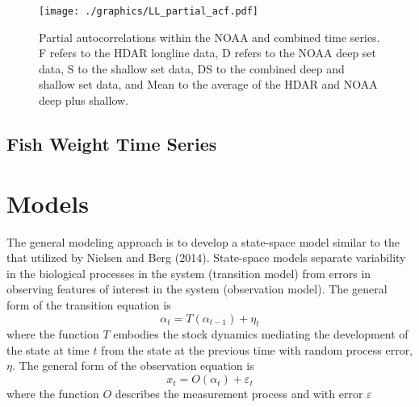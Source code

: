 \documentclass[12pt,letterpaper]{article}
\begin{document}
\begin{figure}
\begin{center}
\texttt{[image: ./graphics/LL\_partial\_acf.pdf]}
\caption{\label{fig:LLpartialacf}
Partial autocorrelations within the NOAA and combined time
series. F refers to the HDAR longline data, D refers to the NOAA deep
set data, S to the shallow set data,
DS to the combined deep and shallow set data, and Mean to the average
of the HDAR and NOAA deep plus shallow.
}
\end{center}
\end{figure}


\clearpage
\subsection*{Fish Weight Time Series}

\section*{Models}
The general modeling approach is to develop a state-space model
similar to the that utilized by Nielsen and Berg (2014).
State-space models separate variability in the biological
processes in the system (transition model)
from errors in observing features of interest
in the system (observation model). 
The general form of the transition equation is
\begin{equation}
\alpha_t=T(\alpha_{t-1}) + \eta_t
\end{equation}
where the function $T$ embodies the stock dynamics mediating the
development of the state at time $t$ from the state at the previous
time with random process error, $\eta$.
The general form of the observation equation is
\begin{equation}
x_t = O(\alpha_t) + \varepsilon_t
\end{equation}
where the function $O$ describes the measurement process and with
error $\varepsilon$
\end{document}
